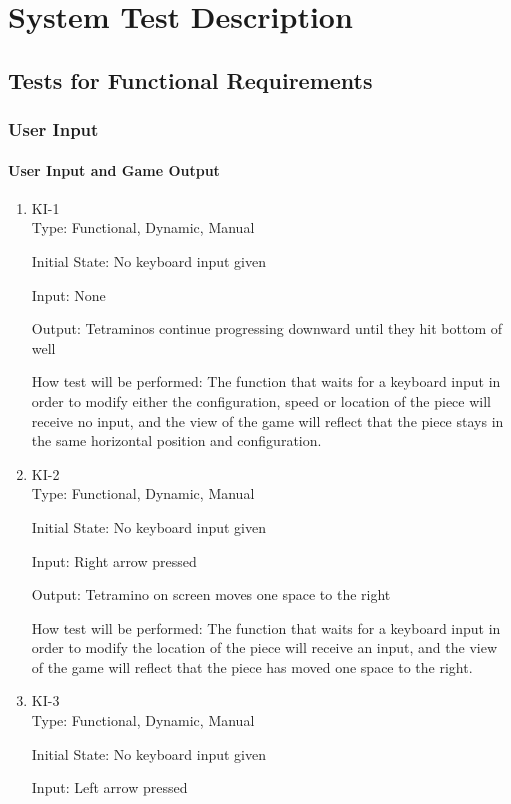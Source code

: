 \documentclass[12pt, titlepage]{article}
\begin{document}
\section{System Test Description}
\subsection{Tests for Functional Requirements}
\subsubsection{User Input}
\paragraph{User Input and Game Output}
\begin{enumerate}
\item{KI-1\\}
Type: Functional, Dynamic, Manual
					
Initial State: No keyboard input given
					
Input: None
					
Output: Tetraminos continue progressing downward until they hit bottom of well
					
How test will be performed: The function that waits for a keyboard input in order to modify either the configuration, speed or location of the piece will receive no input, and the view of the game will reflect that the piece stays in the same horizontal position and configuration.
					
\item{KI-2\\}
Type: Functional, Dynamic, Manual
					
Initial State: No keyboard input given
					
Input: Right arrow pressed
					
Output: Tetramino on screen moves one space to the right
					
How test will be performed: The function that waits for a keyboard input in order to modify the location of the piece will receive an input, and the view of the game will reflect that the piece has moved one space to the right.

\item{KI-3\\}
Type: Functional, Dynamic, Manual
					
Initial State: No keyboard input given
					
Input: Left arrow pressed
					

\end{enumerate}
\end{document}
